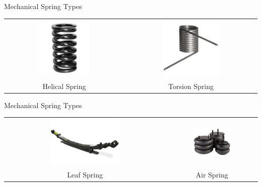 \documentclass[10pt, svgnames]{beamer}
\begin{document}
\begin{frame}[label={sec:org78b40b3}]{Mechanical Spring Types}
\begin{tabular}{cc}
    \includegraphics[width=0.45\textwidth]{pictures/helical-spring} &
    \includegraphics[width=0.45\textwidth]{pictures/torsion-spring} \\
    Helical Spring & Torsion Spring
\end{tabular}
\end{frame}

\begin{frame}[label={sec:orga484b4f}]{Mechanical Spring Types}
\begin{tabular}{cc}
  \includegraphics[width=0.45\textwidth]{pictures/leaf-spring} &
  \includegraphics[width=0.45\textwidth]{pictures/air-spring} \\
  Leaf Spring & Air Spring
\end{tabular}
\end{frame}
\end{document}
